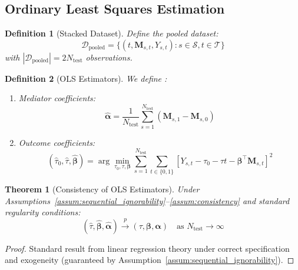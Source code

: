 \documentclass[
    reprint,
    amsmath, amssymb,
    aps,
    floatfix,
    nofootinbib
]{revtex4-1}
\newtheorem{theorem}{Theorem}
\newtheorem{definition}{Definition}
\begin{document}
\subsection{Ordinary Least Squares Estimation}

\begin{definition}[Stacked Dataset]
Define the pooled dataset:
\begin{equation}
    \mathcal{D}_{\text{pooled}} = \{(t, \bm{M}_{s,t}, Y_{s,t}) : s \in \mathcal{S}, t \in \mathcal{T}\}
\end{equation}
with $|\mathcal{D}_{\text{pooled}}| = 2N_{\text{test}}$ observations.
\end{definition}

\begin{definition}[OLS Estimators] We define : 
\begin{enumerate}
    \item Mediator coefficients:
    \begin{equation}
        \hat{\bm{\alpha}} = \frac{1}{N_{\text{test}}} \sum_{s=1}^{N_{\text{test}}} (\bm{M}_{s,1} - \bm{M}_{s,0})
    \end{equation}
    \item Outcome coefficients:
    \begin{equation}
        (\hat{\tau}_0, \hat{\tau}, \hat{\bm{\beta}}) = \arg\min_{\tau_0, \tau, \bm{\beta}} \sum_{s=1}^{N_{\text{test}}} \sum_{t \in \{0,1\}} \left[Y_{s,t} - \tau_0 - \tau t - \bm{\beta}^\top \bm{M}_{s,t}\right]^2
    \end{equation}
\end{enumerate}
\end{definition}

\begin{theorem}[Consistency of OLS Estimators]
Under Assumptions~\ref{assum:sequential_ignorability}--\ref{assum:consistency} and standard regularity conditions:
\begin{equation}
    (\hat{\tau}, \hat{\bm{\beta}}, \hat{\bm{\alpha}}) \xrightarrow{p} (\tau, \bm{\beta}, \bm{\alpha}) \quad \text{as } N_{\text{test}} \to \infty
\end{equation}
\end{theorem}

\begin{proof}
Standard result from linear regression theory under correct specification and exogeneity (guaranteed by Assumption~\ref{assum:sequential_ignorability}).
\end{proof}
\end{document}
